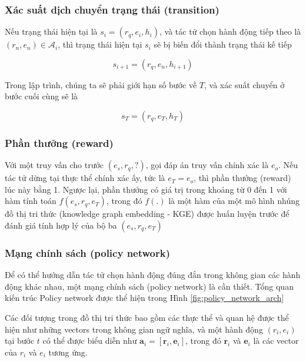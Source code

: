 \subsubsection{Xác suất dịch chuyển trạng thái (transition)}

Nếu trạng thái hiện tại là $s_i = (r_q, {e}_i, {h}_i)$, và tác tử chọn hành động tiếp theo là $({r}_n, {e}_n) \in \mathcal{A}_i$,
thì trạng thái hiện tại $s_i$ sẽ bị biến đổi thành trạng thái kế tiếp 

\begin{equation}
    s_{i+1} = ({r}_q, {e}_n, {h}_{i+1})
\end{equation}

Trong lập trình, chúng ta sẽ phải giới hạn số bước về $T$, và xác suất chuyển ở bước cuối cùng sẽ là

\begin{equation}
    {s}_T = ({r}_q, {e}_T, {h}_{T})
\end{equation}

\subsubsection{Phần thưởng (reward)}

Với một truy vấn cho trước $({e}_s, {r}_q, ?)$, gọi đáp án truy vấn chính xác là ${e}_o$. Nếu tác tử dừng
tại thực thể chính xác ấy, tức là ${e}_T = {e}_o$, thì phần thưởng (reward) lúc này bằng 1. Ngược lại, 
phần thưởng có giá trị trong khoảng từ 0 đến 1 với hàm tính toán $f({e}_s, {r}_q, {e}_T)$, trong đó $f(.)$ 
là một hàm của một mô hình nhúng đồ thị tri thức (knowledge graph embedding - KGE) được huấn luyện trước để đánh giá tính hợp lý của
bộ ba $({e}_s, {r}_q, {e}_T)$

\subsubsection{Mạng chính sách (policy network)}

Để có thể hướng dẫn tác tử chọn hành động đúng đắn trong không gian các hành động khác nhau,
một mạng chính sách (policy network) là cần thiết. Tổng quan kiến trúc Policy network được thể hiện trong Hình \ref{fig:policy_network_arch}

Các đối tượng trong đồ thị tri thức bao gồm các thực thể và quan hệ được thể hiện như những vectors trong không gian
ngữ nghĩa, và một hành động $({r}_i, {e}_i)$ tại bước $t$ có thể được biểu diễn như 
$\mathbf{a}_i = [\textbf{r}_i, \textbf{e}_i]$, trong đó $\textbf{r}_i$ và $\textbf{e}_i$ là các vector của $r_i$ và $e_i$ tương ứng.

